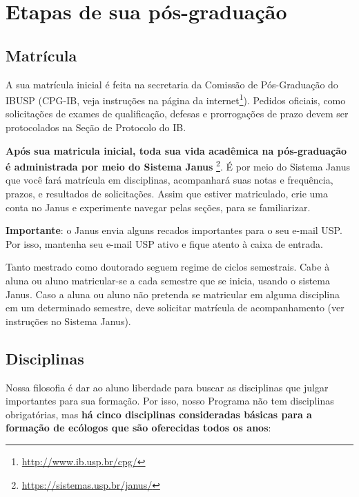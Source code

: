 \documentclass[twoside a4paper 12pt]{report}
\begin{document}
\chapter{Etapas de sua pós-graduação}

\section{Matrícula}

A sua matrícula inicial é feita na secretaria da Comissão de Pós-Graduação do IBUSP (CPG-IB, veja instruções na página da internet\footnote{\url{http://www.ib.usp.br/cpg/}}). Pedidos oficiais, como solicitações de exames de qualificação, defesas e prorrogações de prazo devem ser protocolados na Seção de Protocolo do IB. 

\textbf{Após sua matricula inicial, toda sua vida acadêmica na pós-graduação é administrada por meio do Sistema Janus} \footnote{\url{https://sistemas.usp.br/janus/}}. É por meio do Sistema Janus que você fará matrícula em disciplinas, acompanhará suas notas e frequência, prazos, e resultados de solicitações. Assim que estiver matriculado, crie uma conta no Janus e experimente navegar pelas seções, para se familiarizar. 

\textbf{Importante}: o Janus envia alguns recados importantes para o seu e-mail USP. Por isso, mantenha seu e-mail USP ativo e fique atento à caixa de entrada.

Tanto mestrado como doutorado seguem regime de ciclos semestrais. Cabe à aluna ou aluno matricular-se a cada semestre que se inicia, usando o sistema Janus. Caso a aluna ou aluno não pretenda se matricular em alguma disciplina em um determinado semestre, deve solicitar matrícula de acompanhamento (ver instruções no Sistema Janus).

\section{Disciplinas}
\label{sec:disciplinas}

Nossa filosofia é dar ao aluno liberdade para buscar as disciplinas que julgar importantes para sua formação. Por isso, nosso Programa não tem disciplinas obrigatórias, mas \textbf{há cinco disciplinas consideradas básicas para a formação de ecólogos que são oferecidas todos os anos}:
\end{document}
